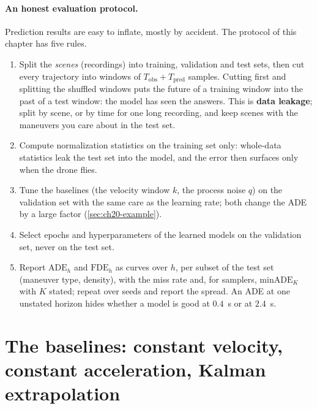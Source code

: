 \paragraph{An honest evaluation protocol.}
\label{sec:ch20-protocol}
Prediction results are easy to inflate, mostly by accident. The protocol of
this chapter has five rules.
\begin{enumerate}
  \item Split the \emph{scenes} (recordings) into training, validation and
  test sets, then cut every trajectory into windows of $T_{\mathrm{obs}} +
  T_{\mathrm{pred}}$ samples. Cutting first and splitting the shuffled
  windows puts the future of a training window into the past of a test
  window: the model has seen the answers. This is \textbf{data
  leakage}; split by scene, or by time for one long
  recording, and keep scenes with the maneuvers you care about in the test
  set.
  \item Compute normalization statistics on the training set only: whole-data
  statistics leak the test set into the model, and the error then surfaces
  only when the drone flies.
  \item Tune the baselines (the velocity window $k$, the process noise $q$)
  on the validation set with the same care as the learning rate; both change
  the ADE by a large factor (\cref{sec:ch20-example}).
  \item Select epochs and hyperparameters of the learned models on the
  validation set, never on the test set.
  \item Report $\mathrm{ADE}_h$ and $\mathrm{FDE}_h$ as curves over $h$, per
  subset of the test set (maneuver type, density), with the miss rate and,
  for samplers, $\mathrm{minADE}_K$ with $K$ stated; repeat over seeds and
  report the spread. An ADE at one unstated horizon hides whether a model is
  good at $0.4$~s or at $2.4$~s.
\end{enumerate}

\section[The physics baselines]{The baselines: constant velocity, constant acceleration, Kalman extrapolation}
\label{sec:ch20-baselines}

